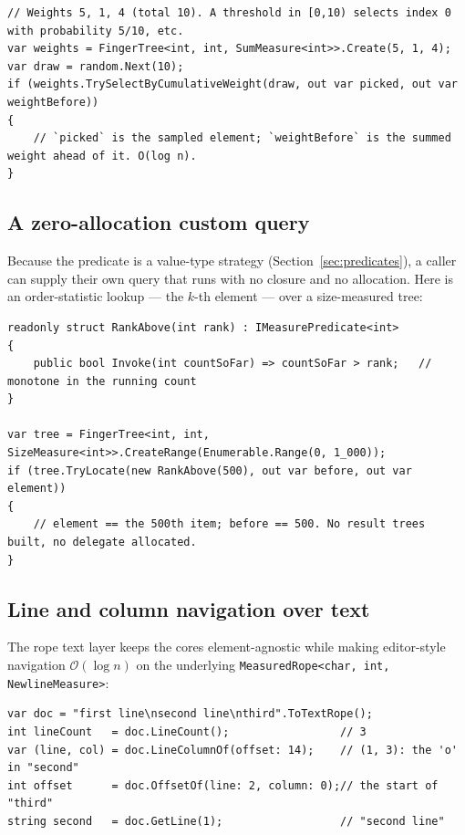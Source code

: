 \documentclass[11pt]{article}
\newcommand{\cs}[1]{\lstinline|#1|}
\newcommand{\bigO}{\ensuremath{\mathcal{O}}}
\begin{document}
\begin{lstlisting}
// Weights 5, 1, 4 (total 10). A threshold in [0,10) selects index 0 with probability 5/10, etc.
var weights = FingerTree<int, int, SumMeasure<int>>.Create(5, 1, 4);
var draw = random.Next(10);
if (weights.TrySelectByCumulativeWeight(draw, out var picked, out var weightBefore))
{
    // `picked` is the sampled element; `weightBefore` is the summed weight ahead of it. O(log n).
}
\end{lstlisting}

\subsection{A zero-allocation custom query}

Because the predicate is a value-type strategy (Section~\ref{sec:predicates}), a caller can supply their own
query that runs with no closure and no allocation. Here is an order-statistic lookup --- the $k$-th element
--- over a size-measured tree:

\begin{lstlisting}
readonly struct RankAbove(int rank) : IMeasurePredicate<int>
{
    public bool Invoke(int countSoFar) => countSoFar > rank;   // monotone in the running count
}

var tree = FingerTree<int, int, SizeMeasure<int>>.CreateRange(Enumerable.Range(0, 1_000));
if (tree.TryLocate(new RankAbove(500), out var before, out var element))
{
    // element == the 500th item; before == 500. No result trees built, no delegate allocated.
}
\end{lstlisting}

\subsection{Line and column navigation over text}

The rope text layer keeps the cores element-agnostic while making editor-style navigation $\bigO(\log n)$
on the underlying \cs{MeasuredRope<char, int, NewlineMeasure>}:

\begin{lstlisting}
var doc = "first line\nsecond line\nthird".ToTextRope();
int lineCount   = doc.LineCount();                 // 3
var (line, col) = doc.LineColumnOf(offset: 14);    // (1, 3): the 'o' in "second"
int offset      = doc.OffsetOf(line: 2, column: 0);// the start of "third"
string second   = doc.GetLine(1);                  // "second line"
\end{lstlisting}
\end{document}

